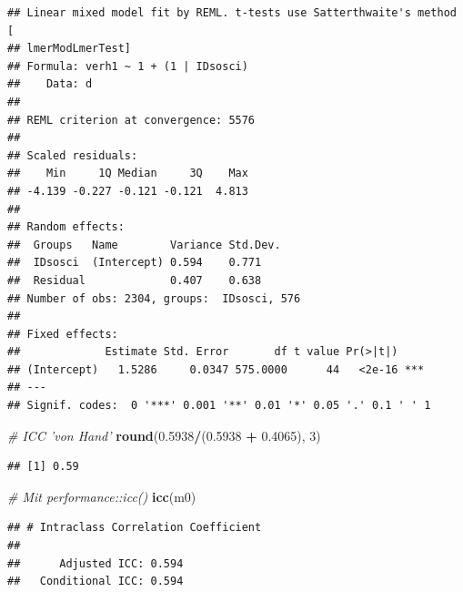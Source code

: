 \documentclass[
]{book}
\newenvironment{Shaded}{\begin{snugshade}}{\end{snugshade}}
\newcommand{\CommentTok}[1]{\textcolor[rgb]{0.56,0.35,0.01}{\textit{#1}}}
\newcommand{\DecValTok}[1]{\textcolor[rgb]{0.00,0.00,0.81}{#1}}
\newcommand{\FloatTok}[1]{\textcolor[rgb]{0.00,0.00,0.81}{#1}}
\newcommand{\KeywordTok}[1]{\textcolor[rgb]{0.13,0.29,0.53}{\textbf{#1}}}
\newcommand{\NormalTok}[1]{#1}
\newcommand{\OperatorTok}[1]{\textcolor[rgb]{0.81,0.36,0.00}{\textbf{#1}}}
\newcommand{\StringTok}[1]{\textcolor[rgb]{0.31,0.60,0.02}{#1}}
\begin{document}
\begin{verbatim}
## Linear mixed model fit by REML. t-tests use Satterthwaite's method [
## lmerModLmerTest]
## Formula: verh1 ~ 1 + (1 | IDsosci)
##    Data: d
## 
## REML criterion at convergence: 5576
## 
## Scaled residuals: 
##    Min     1Q Median     3Q    Max 
## -4.139 -0.227 -0.121 -0.121  4.813 
## 
## Random effects:
##  Groups   Name        Variance Std.Dev.
##  IDsosci  (Intercept) 0.594    0.771   
##  Residual             0.407    0.638   
## Number of obs: 2304, groups:  IDsosci, 576
## 
## Fixed effects:
##             Estimate Std. Error       df t value Pr(>|t|)    
## (Intercept)   1.5286     0.0347 575.0000      44   <2e-16 ***
## ---
## Signif. codes:  0 '***' 0.001 '**' 0.01 '*' 0.05 '.' 0.1 ' ' 1
\end{verbatim}

\begin{Shaded}
\begin{Highlighting}[]
\CommentTok{# ICC 'von Hand'}
\KeywordTok{round}\NormalTok{(}\FloatTok{0.5938}\OperatorTok{/}\NormalTok{(}\FloatTok{0.5938} \OperatorTok{+}\StringTok{ }\FloatTok{0.4065}\NormalTok{), }\DecValTok{3}\NormalTok{)}
\end{Highlighting}
\end{Shaded}

\begin{verbatim}
## [1] 0.59
\end{verbatim}

\begin{Shaded}
\begin{Highlighting}[]
\CommentTok{# Mit performance::icc()}
\KeywordTok{icc}\NormalTok{(m0)}
\end{Highlighting}
\end{Shaded}

\begin{verbatim}
## # Intraclass Correlation Coefficient
## 
##      Adjusted ICC: 0.594
##   Conditional ICC: 0.594
\end{verbatim}
\end{document}
